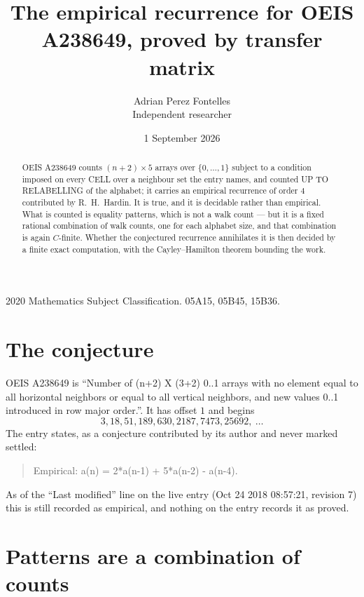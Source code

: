 \documentclass[11pt,a4paper]{article}
\title{The empirical recurrence for OEIS A238649, proved by transfer matrix}
\author{Adrian Perez Fontelles\\ \small Independent researcher}
\date{1 September 2026}
\theoremstyle{plain}
\theoremstyle{definition}
\begin{document}
\maketitle

\begin{abstract}
OEIS A238649 counts $(n+2)\times5$ arrays over $\{0,\dots,1\}$ subject to a condition imposed on
every CELL over a neighbour set the entry names, and counted UP TO RELABELLING of the
alphabet; it carries an empirical recurrence of order $4$ contributed by
R.~H.~Hardin. It is true, and it is decidable rather than empirical. What is counted is
equality patterns, which is not a walk count --- but it is a fixed rational combination of
walk counts, one for each alphabet size, and that combination is again $C$-finite. Whether the
conjectured recurrence annihilates it is then decided by a finite exact computation, with the
Cayley--Hamilton theorem bounding the work.
\end{abstract}

\noindent\small 2020 Mathematics Subject Classification. 05A15, 05B45, 15B36.\normalsize

\section{The conjecture}

OEIS A238649 is ``Number of (n+2) X (3+2) 0..1 arrays with no element equal to all horizontal neighbors or equal to all vertical neighbors, and new values 0..1 introduced in row major order.''. It has offset $1$ and begins
\[
3, 18, 51, 189, 630, 2187, 7473, 25692,\ \dots
\]
The entry states, as a conjecture contributed by its author and never marked settled:
\begin{quote}
Empirical: a(n) = 2*a(n-1) + 5*a(n-2) - a(n-4).
\end{quote}
As of the ``Last modified'' line on the live entry (Oct 24 2018 08:57:21, revision 7) this is still
recorded as empirical, and nothing on the entry records it as proved.

\section{Patterns are a combination of counts}
\end{document}
